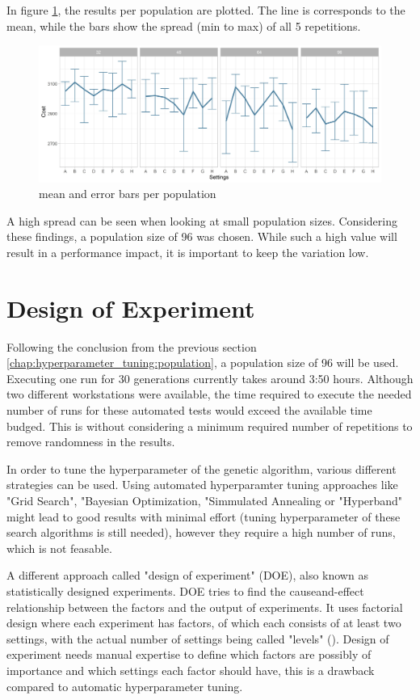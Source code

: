 In figure \ref{figure:population:results}, the results per population are plotted. The line is corresponds to the mean, while the bars show the spread (min to max) of all 5 repetitions.
\begin{figure}[H] 
	\label{figure:population:results}
	\includegraphics[width=1\linewidth]{simulations/population/plots/comparison}
	\caption{mean and error bars per population}
\end{figure}


A high spread can be seen when looking at small population sizes. Considering these findings, a population size of 96 was chosen. While such a high value will result in a performance impact, it is important to keep the variation low.


\section{Design of Experiment}
\label{chap:hyperparameter_tuning:other_parameter}

Following the conclusion from the previous section \ref{chap:hyperparameter_tuning:population}, a population size of 96 will be used. Executing one run for 30 generations currently takes around 3:50 hours. Although two different workstations were available, the time required to execute the needed number of runs for these automated tests would exceed the available time budged. This is without considering a minimum required number of repetitions to remove randomness in the results.

In order to tune the hyperparameter of the genetic algorithm, various different strategies can be used. Using automated hyperparamter tuning approaches like "Grid Search", "Bayesian Optimization, "Simmulated Annealing or "Hyperband" might lead to good results with minimal effort (tuning hyperparameter of these search algorithms is still needed), however they require a high number of runs, which is not feasable. 

A different approach called "design of experiment" (DOE), also known as statistically designed experiments. DOE tries to find the causeand-effect relationship between the factors and the output of experiments.
It uses factorial design where each experiment has factors, of which each consists of at least two settings, with the actual number of settings being called "levels" (\cite{yang_design_2009}). Design of experiment needs manual expertise to define which factors are possibly of importance and which settings each factor should have, this is a drawback compared to automatic hyperparameter tuning.

